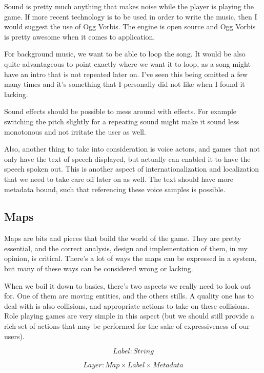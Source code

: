 Sound is pretty much anything that makes noise while the player is playing the
game. If more recent technology is to be used in order to write the music, then
I would suggest the use of Ogg Vorbis. The engine is open source and Ogg Vorbis
is pretty awesome when it comes to application.

For background music, we want to be able to loop the song. It would be also
quite advantageous to point exactly where we want it to loop, as a song might
have an intro that is not repeated later on. I've seen this being omitted a few
many times and it's something that I personally did not like when I found it
lacking.

Sound effects should be possible to mess around with effects. For example
switching the pitch slightly for a repeating sound might make it sound less
monotonous and not irritate the user as well.

Also, another thing to take into consideration is voice actors, and games that
not only have the text of speech displayed, but actually can enabled it to have
the speech spoken out. This is another aspect of internationalization and
localization that we need to take care off later on as well. The text should
have more metadata bound, such that referencing these voice samples is possible.

\subsection{Maps}

Maps are bits and pieces that build the world of the game. They are pretty
essential, and the correct analysis, design and implementation of them, in my
opinion, is critical. There's a lot of ways the maps can be expressed in a
system, but many of these ways can be considered wrong or lacking.

When we boil it down to basics, there's two aspects we really need to look out
for. One of them are moving entities, and the others stills. A quality one has
to deal with is also collisions, and appropriate actions to take on these
collisions. Role playing games are very simple in this aspect (but we should
still provide a rich set of actions that may be performed for the sake of
expressiveness of our users).

\begin{equation}
Label\colon String
\end{equation}

\begin{equation}
Layer\colon Map \times Label \times Metadata
\end{equation}

